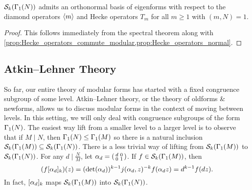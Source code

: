      \begin{theorem}\label{thm:eigenforms_forms_spectral_theory}
        $\mathcal{S}_{k}(\Gamma_{1}(N))$ admits an orthonormal basis of eigenforms with respect to the diamond operators $\langle m\rangle$ and Hecke operators $T_{m}$ for all $m \ge 1$ with $(m,N) = 1$.
      \end{theorem}
      \begin{proof}
        This follows immediately from the spectral theorem along with \cref{prop:Hecke_operators_commute_modular,prop:Hecke_operators_normal}.
      \end{proof}

    \subsection*{Atkin–Lehner Theory}
      So far, our entire theory of modular forms has started with a fixed congruence subgroup of some level. Atkin–Lehner theory, or the theory of oldforms \& newforms, allows us to discuss modular forms in the context of moving between levels. In this setting, we will only deal with congruence subgroups of the form $\Gamma_{1}(N)$. The easiest way lift from a smaller level to a larger level is to observe that if $M \mid N$, then $\Gamma_{1}(N) \le \Gamma_{1}(M)$ so there is a natural inclusion $\mathcal{S}_{k}(\Gamma_{1}(M)) \subseteq \mathcal{S}_{k}(\Gamma_{1}(N))$. There is a less trivial way of lifting from $\mathcal{S}_{k}(\Gamma_{1}(M))$ to $\mathcal{S}_{k}(\Gamma_{1}(N))$. For any $d \mid \frac{N}{M}$, let $\alpha_{d} = \begin{psmallmatrix} d & 0 \\ 0 & 1 \end{psmallmatrix}$. If $f \in \mathcal{S}_{k}(\Gamma_{1}(M))$, then
      \[
          (f[\alpha_{d}]_{k})(z) = (\det(\alpha_{d}))^{k-1}j(\alpha_{d},z)^{-k}f(\alpha_{d} z) = d^{k-1}f(dz).
      \]
      In fact, $[\alpha_{d}]_{k}$ maps $\mathcal{S}_{k}(\Gamma_{1}(M))$ into $\mathcal{S}_{k}(\Gamma_{1}(N))$.
      
